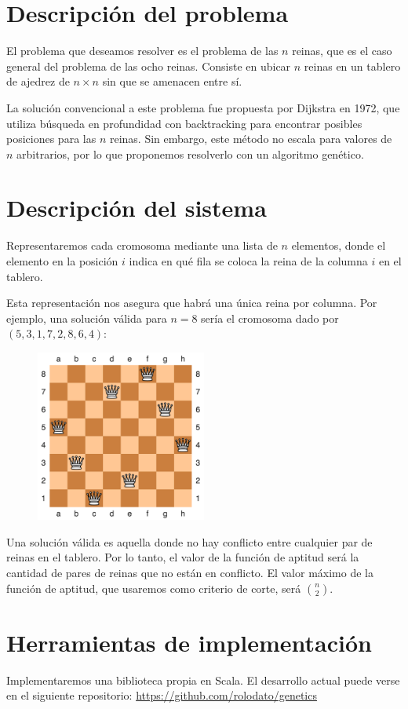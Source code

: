 \documentclass[a4paper,12pt]{article}
\begin{document}
\section{Descripción del problema}

El problema que deseamos resolver es el problema de las $n$ reinas,
que es el caso general del problema de las ocho reinas.
Consiste en ubicar $n$ reinas en un tablero de ajedrez de $n \times n$ sin que se amenacen entre sí\cite{weisstein}.

La solución convencional a este problema fue propuesta por Dijkstra en 1972,
que utiliza búsqueda en profundidad con \foreignlanguage{english}{backtracking} para encontrar posibles posiciones para las $n$ reinas.
Sin embargo, este método no escala para valores de $n$ arbitrarios,
por lo que proponemos resolverlo con un algoritmo genético\cite{thada}.

\section{Descripción del sistema}

Representaremos cada cromosoma mediante una lista de $n$ elementos,
donde el elemento en la posición $i$ indica en qué fila se coloca la reina de la columna $i$ en el tablero.

Esta representación nos asegura que habrá una única reina por columna.
Por ejemplo, una solución válida\cite{wiki} para $n = 8$ sería el cromosoma dado por $(5, 3, 1, 7, 2, 8, 6, 4)$:

\begin{figure}[h]
\centering
\includegraphics[width=0.5\textwidth]{nqueen-solution-8.png}
\end{figure}

Una solución válida es aquella donde no hay conflicto entre cualquier par de reinas en el tablero.
Por lo tanto, el valor de la función de aptitud será la cantidad de pares de reinas que no están en conflicto.
El valor máximo de la función de aptitud,
que usaremos como criterio de corte,
será $n \choose 2$.

\section{Herramientas de implementación}

Implementaremos una biblioteca propia en Scala.
El desarrollo actual puede verse en el siguiente repositorio: \url{https://github.com/rolodato/genetics}


\printbibliography
\end{document}
